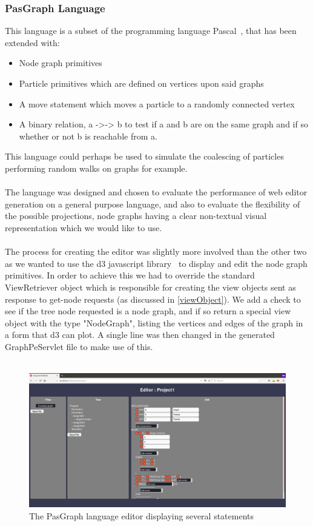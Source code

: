 \documentclass{article}
\begin{document}
\subsubsection{PasGraph Language}\label{pasgraph}
This language is a subset of the programming language Pascal~\cite{pascal}, that has been extended with: 
\begin{itemize}
\item Node graph primitives
\item Particle primitives which are defined on vertices upon said graphs
\item A move statement which moves a particle to a randomly connected vertex
\item A binary relation, a ->-> b to test if a and b are on the same graph and if so whether or not b is reachable from a.
\end{itemize}
This language could perhaps be used to simulate the coalescing of particles performing random walks on graphs for example. 
\\
\\
The language was designed and chosen to evaluate the performance of web editor generation on a general purpose language, and also to evaluate the flexibility of the possible projections, node graphs having a clear non-textual visual representation which we would like to use.
\\
\\
The process for creating the editor was slightly more involved than the other two as we wanted to use the d3 javascript library~\cite{d3} to display and edit the node graph primitives. In order to achieve this we had to override the standard ViewRetriever object which is responsible for creating the view objects sent as response to get-node requests (as discussed in \ref{viewObject}). We add a check to see if the tree node requested is a node graph, and if so return a special view object with the type "NodeGraph", listing the vertices and edges of the graph in a form that d3 can plot. A single line was then changed in the generated GraphPeServlet file to make use of this.
\\
\\
\begin{figure}[h!]
  \centering
  \includegraphics[width=\linewidth]{./Screenshots/graphUI1.png}
  \caption{The PasGraph language editor displaying several statements}
  \label{fig:pasgraphUI1}
\end{figure}
\end{document}
